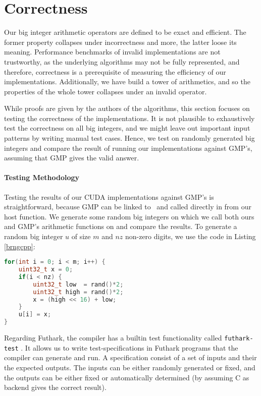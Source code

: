 \section{Correctness}
\label{sec:cor}

Our big integer arithmetic operators are defined to be exact and efficient. The
former property collapses under incorrectness and more, the latter loose its
meaning. Performance benchmarks of invalid implementations are not trustworthy,
as the underlying algorithms may not be fully represented, and therefore,
correctness is a prerequisite of measuring the efficiency of our
implementations. Additionally, we have build a tower of arithmetics, and so the
properties of the whole tower collapses under an invalid operator.

While proofs are given by the authors of the algorithms, this section focuses on
testing the correctness of the implementations. It is not plausible to
exhaustively test the correctness on all big integers, and we might leave out
important input patterns by writing manual test cases. Hence, we test on
randomly generated big integers and compare the result of running our
implementations against GMP's, assuming that GMP gives the valid answer.

\paragraph{Testing Methodology}
Testing the results of our CUDA implementations against GMP's is
straightforward, because GMP can be linked to \cpp\ and called directly in from
our host function. We generate some random big integers on which we call both
ours and GMP's arithmetic functions on and compare the results. To generate a
random big integer $u$ of size $m$ and $\mathit{nz}$ non-zero digits, we use the
code in Listing \ref{brngcpp}:
\begin{lstlisting}[language=CPP, caption={\footnotesize Random big integer generator in \cpp\ with $u$ of size $m$ and $nz$ non-zero digits.}, label={brngcpp}]
for(int i = 0; i < m; i++) {
    uint32_t x = 0;
    if(i < nz) {
        uint32_t low  = rand()*2;
        uint32_t high = rand()*2;
        x = (high << 16) + low;
    }
    u[i] = x;
}
\end{lstlisting}

Regarding Futhark, the compiler has a builtin test functionality called
\texttt{futhark-test} \cite{futguide}. It allows us to write test-specifications
in Futhark programs that the compiler can generate and run. A specification
consist of a set of inputs and their the expected outputs. The inputs can be
either randomly generated or fixed, and the outputs can be either fixed or
automatically determined (by assuming C as backend gives the correct result).

